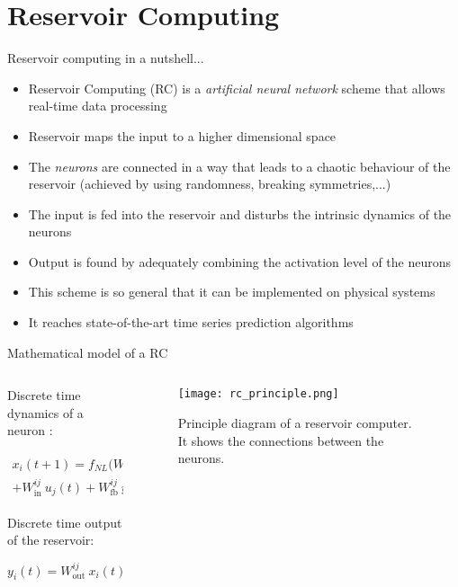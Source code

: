 \section{Reservoir Computing}

\begin{frame}{Reservoir computing in a nutshell...}
	\begin{itemize}
		\item Reservoir Computing (RC) is a \emph{artificial neural network} scheme that allows real-time data processing
		\item Reservoir maps the input to a higher dimensional space
		\item The \emph{neurons} are connected in a way that leads to a chaotic behaviour of the reservoir (achieved by using randomness, breaking symmetries,...)
		\item The input is fed into the reservoir and disturbs the intrinsic dynamics of the neurons
		\item Output is found by adequately combining the activation level of the neurons
		\item This scheme is so general that it can be implemented on physical systems
		\item It reaches state-of-the-art time series prediction algorithms
	\end{itemize}
\end{frame}

\begin{frame}{Mathematical model of a RC}
	\begin{columns}[T] %
	\begin{column}{.48\textwidth}
	
		Discrete time dynamics of a neuron \cite{JaegerH.2001Tesa}:
		
		\begin{multline}
			x_i (t+1) = f_{NL} \biggl( W^{ij}~x_j(t)\\ + W^{ij}_{\text{in}}~u_j(t)+W^{ij}_{\text{fb}}~y_j(t) \biggl)
		\end{multline}
		
		Discrete time output of the reservoir:
		
		\begin{equation}
			y_i(t) = W^{ij}_{\text{out}} ~x_i(t)
		\end{equation}
	
	\end{column}%
	\hfill%
	\begin{column}{.48\textwidth}
	
	\begin{figure}
		\texttt{[image: rc\_principle.png]}
		\caption{Principle diagram of a reservoir computer. It shows the connections between the neurons.\cite{financialTimeSeries}}
	\end{figure}
	
	\end{column}%
	\end{columns}
\end{frame}

